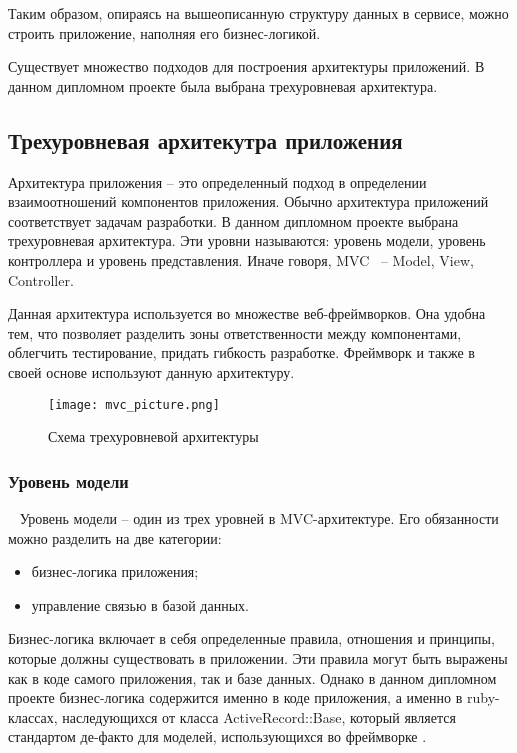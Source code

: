 Таким образом, опираясь на вышеописанную структуру данных в сервисе, можно строить приложение, наполняя его бизнес-логикой.

Существует множество подходов для построения архитектуры приложений. В данном дипломном проекте была выбрана трехуровневая архитектура.

\subsection{Трехуровневая архитекутра приложения}
\label{sub:arch_and_mod:mvc}

Архитектура приложения -- это определенный подход в определении взаимоотношений компонентов приложения. Обычно архитектура приложений соответствует задачам разработки. В данном дипломном проекте выбрана трехуровневая архитектура. Эти уровни называются: уровень модели, уровень контроллера и уровень представления. Иначе говоря, MVC~\cite{mvc_doc} -- Model, View, Controller.

Данная архитектура используется во множестве веб-фреймворков. Она удобна тем, что позволяет разделить зоны ответственности между компонентами, облегчить тестирование, придать гибкость разработке. Фреймворк \ror{} и \ajs{} также в своей основе используют данную архитектуру.

\begin{figure}[ht]
\centering
  \texttt{[image: mvc\_picture.png]}
  \caption{ Схема трехуровневой архитектуры }
  \label{fig:arch_and_mod:mvc:picture}
\end{figure}

\subsubsection{Уровень модели}
\label{sub:arch_and_mod:mvc:model}
~\newline
\indent Уровень модели -- один из трех уровней в MVC-архитектуре. Его обязанности можно разделить на две категории:

\begin{itemize}
  \item бизнес-логика приложения;
  \item управление связью в базой данных.
\end{itemize}

Бизнес-логика включает в себя определенные правила, отношения и принципы, которые должны существовать в приложении. Эти правила могут быть выражены как в коде самого приложения, так и базе данных. Однако в данном дипломном проекте бизнес-логика содержится именно в коде приложения, а именно в ruby-классах, наследующихся от класса ActiveRecord::Base, который является стандартом де-факто для моделей, использующихся во фреймворке \ror{}.


